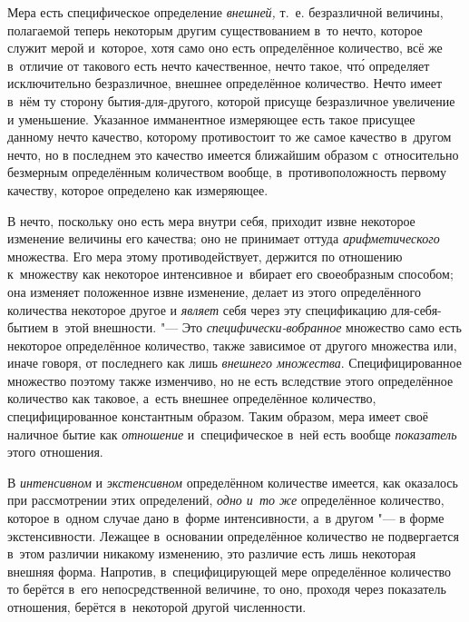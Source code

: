 
Мера есть специфическое определение {\em внешней,} т.~е. безразличной величины,
полагаемой теперь некоторым другим существованием в~то нечто, которое служит
мерой и~которое, хотя само оно есть определённое количество, всё же в~отличие
от такового есть нечто качественное, нечто такое, чт\'{о} определяет
исключительно безразличное, внешнее определённое количество. Нечто имеет в~нём
ту сторону бытия-для-другого, которой присуще безразличное увеличение и
уменьшение. Указанное имманентное измеряющее есть такое присущее данному нечто
качество, которому противостоит то же самое качество в~другом нечто, но в
последнем это качество имеется ближайшим образом с~относительно безмерным
определённым количеством вообще, в~противоположность первому качеству, которое
определено как измеряющее.

В нечто, поскольку оно есть мера внутри себя, приходит извне некоторое
изменение величины его качества; оно не принимает оттуда {\em арифметического}
множества. Его мера этому противодействует, держится по отношению к~множеству
как некоторое интенсивное и~вбирает его своеобразным способом; она изменяет
положенное извне изменение, делает из этого определённого количества некоторое
другое и {\em являет} себя через эту спецификацию для-себя-бытием в~этой
внешности. "--- Это {\em специфически-вобранное} множество само есть некоторое
определённое количество, также зависимое от другого множества или, иначе
говоря, от последнего как лишь {\em внешнего множества}. Специфицированное
множество поэтому также изменчиво, но не есть вследствие этого определённое
количество как таковое, а~есть внешнее определённое количество,
специфицированное константным образом. Таким образом, мера имеет своё наличное
бытие как {\em отношение} и~специфическое в~ней есть вообще {\em показатель}
этого отношения.

В {\em интенсивном} и {\em экстенсивном} определённом количестве имеется, как
оказалось при рассмотрении этих определений, {\em одно и~то же} определённое
количество, которое в~одном случае дано в~форме интенсивности, а~в другом "---
в форме экстенсивности. Лежащее в~основании определённое количество не
подвергается в~этом различии никакому изменению, это различие есть лишь
некоторая внешняя форма. Напротив, в~специфицирующей мере определённое
количество то берётся в~его непосредственной величине, то оно, проходя через
показатель отношения, берётся в~некоторой другой численности.

